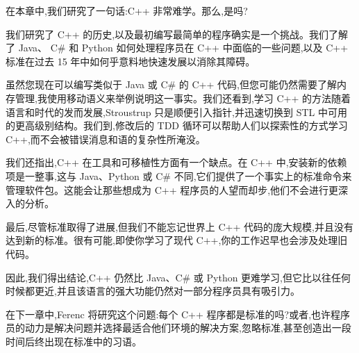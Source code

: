 在本章中,我们研究了一句话:C++ 非常难学。那么,是吗? 

我们研究了 C++ 的历史,以及最初编写最简单的程序确实是一个挑战。我们了解了 Java、 C\# 和 Python 如何处理程序员在 C++ 中面临的一些问题,以及 C++ 标准在过去 15 年中如何乎意料地快速发展以消除其障碍。

虽然您现在可以编写类似于 Java 或 C\# 的 C++ 代码,但您可能仍然需要了解内存管理,我使用移动语义来举例说明这一事实。我们还看到,学习 C++ 的方法随着语言和时代的发而发展,Stroustrup 只是顺便引入指针,并迅速切换到 STL 中可用的更高级别结构。我们到,修改后的 TDD 循环可以帮助人们以探索性的方式学习 C++,而不会被错误消息和语的复杂性所淹没。

我们还指出,C++ 在工具和可移植性方面有一个缺点。在 C++ 中,安装新的依赖项是一整事,这与 Java、Python 或 C\# 不同,它们提供了一个事实上的标准命令来管理软件包。这能会让那些想成为 C++ 程序员的人望而却步,他们不会进行更深入的分析。

最后,尽管标准取得了进展,但我们不能忘记世界上 C++ 代码的庞大规模,并且没有达到新的标准。很有可能,即使你学习了现代 C++,你的工作迟早也会涉及处理旧代码。

因此,我们得出结论,C++ 仍然比 Java、C\# 或 Python 更难学习,但它比以往任何时候都更近,并且该语言的强大功能仍然对一部分程序员具有吸引力。

在下一章中,Ferenc 将研究这个问题:每个 C++ 程序都是标准的吗?或者,也许程序员的动力是解决问题并选择最适合他们环境的解决方案,忽略标准,甚至创造出一段时间后终出现在标准中的习语。